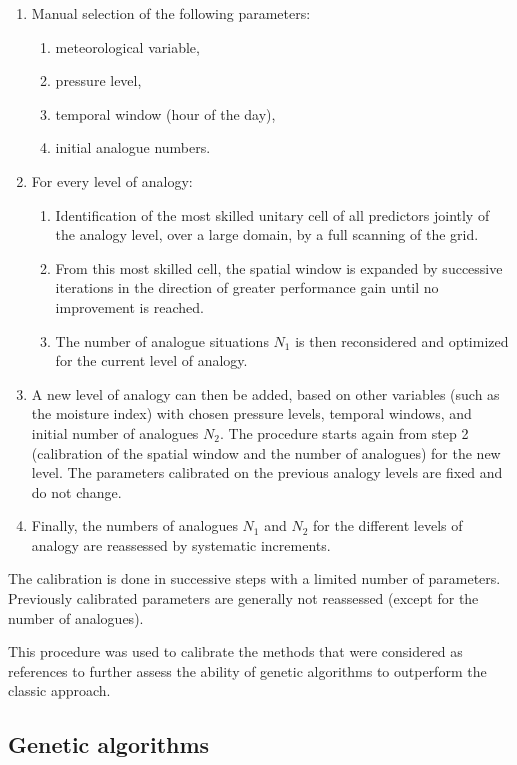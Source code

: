 \documentclass[review]{elsarticle}
\begin{document}
\begin{enumerate}
	\item Manual selection of the following parameters:
	\begin{enumerate}
		\item meteorological variable,
		\item pressure level,
		\item temporal window (hour of the day),
		\item initial analogue numbers.
	\end{enumerate}
	
	\item For every level of analogy:
	\begin{enumerate}
		\item Identification of the most skilled unitary cell of all predictors jointly of the analogy level, over a large domain, by a full scanning of the grid.
		\item From this most skilled cell, the spatial window is expanded by successive iterations in the direction of greater performance gain until no improvement is reached.
		\item The number of analogue situations $N_{1}$ is then reconsidered and optimized for the current level of analogy.
	\end{enumerate}
	\item A new level of analogy can then be added, based on other variables (such as the moisture index) with chosen pressure levels, temporal windows, and initial number of analogues $N_{2}$. The procedure starts again from step 2 (calibration of the spatial window and the number of analogues) for the new level. The parameters calibrated on the previous analogy levels are fixed and do not change. 
	\item Finally, the numbers of analogues $N_{1}$ and $N_{2}$ for the different levels of analogy are reassessed by systematic increments.
\end{enumerate}

The calibration is done in successive steps with a limited number of parameters. Previously calibrated parameters are generally not reassessed (except for the number of analogues).

This procedure was used to calibrate the methods that were considered as references to further assess the ability of genetic algorithms to outperform the classic approach.


\subsection{Genetic algorithms}
\label{sec:gas}
\end{document}
